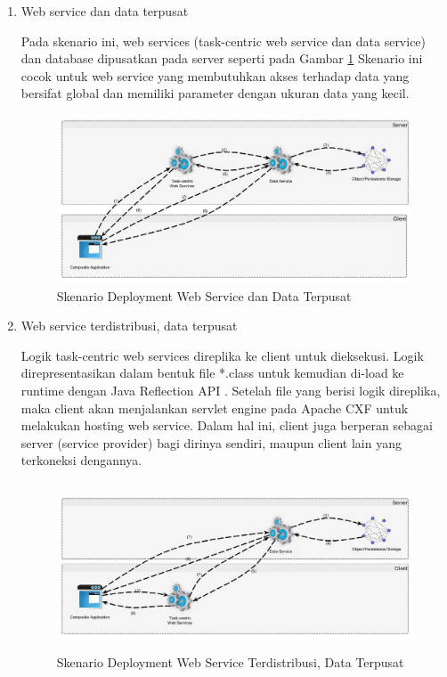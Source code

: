 \begin{enumerate}
\item Web service dan data terpusat

Pada skenario ini, web services (task-centric web service dan data service) dan database dipusatkan pada server seperti pada Gambar \ref{fig:deployment-1} Skenario ini cocok untuk web service yang membutuhkan akses terhadap data yang bersifat global dan memiliki parameter dengan ukuran data yang kecil.

\begin{figure}[H]
    \centering
    \includegraphics[height=5cm]{images/deployment-1}
    \caption{Skenario Deployment Web Service dan Data Terpusat}
    \label{fig:deployment-1}
\end{figure}

\item Web service terdistribusi, data terpusat

Logik task-centric web services direplika ke client untuk dieksekusi. Logik direpresentasikan dalam bentuk file *.class untuk kemudian di-load ke runtime dengan Java Reflection API . Setelah file yang berisi logik direplika, maka client akan menjalankan servlet engine pada Apache CXF untuk melakukan hosting web service. Dalam hal ini, client juga berperan sebagai server (service provider) bagi dirinya sendiri, maupun client lain yang terkoneksi dengannya.

\begin{figure}[H]
    \centering
    \includegraphics[height=5cm]{images/deployment-2}
    \caption{Skenario Deployment Web Service Terdistribusi, Data Terpusat}
    \label{fig:deployment-2}
\end{figure}


\end{enumerate}
